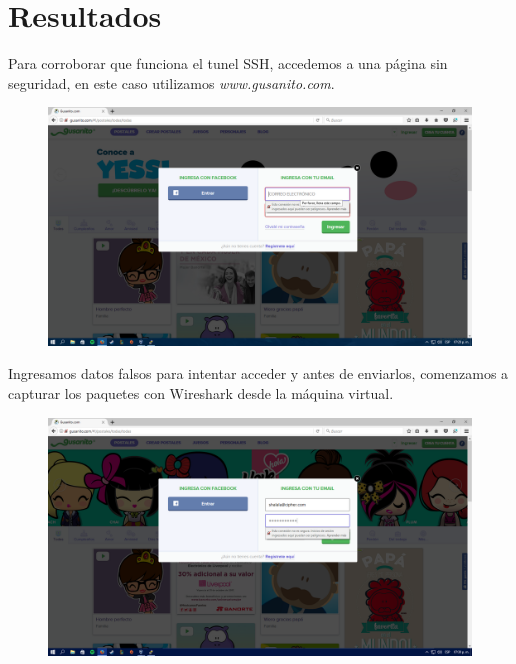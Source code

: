 \documentclass{article}
\begin{document}
\section{Resultados}

Para corroborar que funciona el tunel SSH, accedemos a una p\'agina sin seguridad, en este caso utilizamos \emph{www.gusanito.com}.

\begin{figure}[H]
\centering
\includegraphics[width=1\textwidth]{14-GUSANITO}
\end{figure}

Ingresamos datos falsos para intentar acceder y antes de enviarlos, comenzamos a capturar los paquetes con Wireshark desde la m\'aquina virtual.

\begin{figure}[H]
\centering
\includegraphics[width=1\textwidth]{15-CORREO}
\end{figure}
\end{document}
